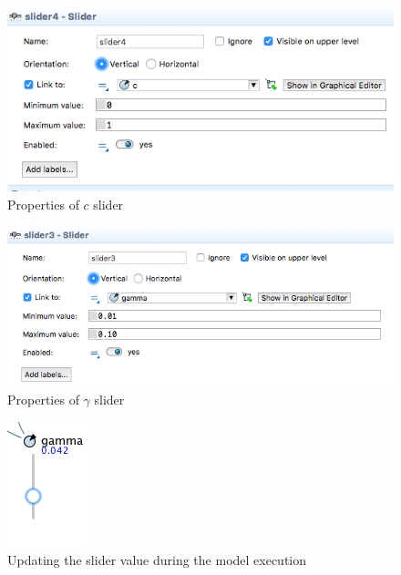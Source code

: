 \begin{figure}[H]
  \centering
  \includegraphics[height=0.3\textwidth]{img/screens/sliders/sliders8}
  \caption{Properties of $c$ slider}
\end{figure}

\begin{figure}[H]
  \centering
  \includegraphics[height=0.3\textwidth]{img/screens/sliders/sliders9}
  \caption{Properties of $\gamma$ slider}
\end{figure}

\begin{figure}[H]
  \centering
  \includegraphics[height=0.2\textwidth]{img/screens/sliders/sliders5}
  \caption{Updating the slider value during the model execution}
\end{figure}


